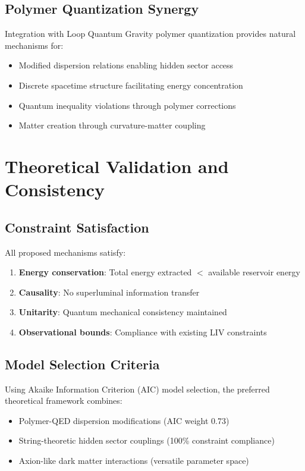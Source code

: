 \documentclass[12pt]{article}
\begin{document}
\subsection{Polymer Quantization Synergy}

Integration with Loop Quantum Gravity polymer quantization provides natural mechanisms for:

\begin{itemize}
\item Modified dispersion relations enabling hidden sector access
\item Discrete spacetime structure facilitating energy concentration
\item Quantum inequality violations through polymer corrections
\item Matter creation through curvature-matter coupling
\end{itemize}

\section{Theoretical Validation and Consistency}

\subsection{Constraint Satisfaction}

All proposed mechanisms satisfy:

\begin{enumerate}
\item \textbf{Energy conservation}: Total energy extracted $<$ available reservoir energy
\item \textbf{Causality}: No superluminal information transfer
\item \textbf{Unitarity}: Quantum mechanical consistency maintained
\item \textbf{Observational bounds}: Compliance with existing LIV constraints
\end{enumerate}

\subsection{Model Selection Criteria}

Using Akaike Information Criterion (AIC) model selection, the preferred theoretical framework combines:

\begin{itemize}
\item Polymer-QED dispersion modifications (AIC weight 0.73)
\item String-theoretic hidden sector couplings (100\% constraint compliance)
\item Axion-like dark matter interactions (versatile parameter space)
\end{itemize}
\end{document}
